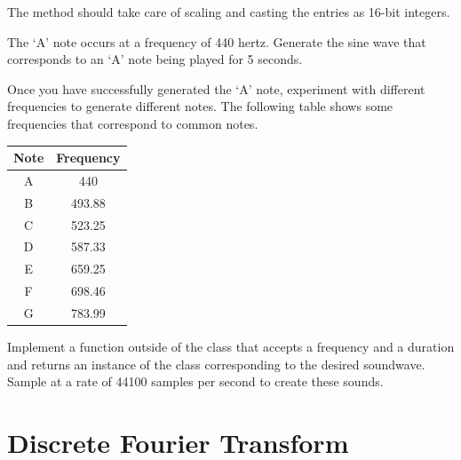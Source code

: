 The  method should take care of scaling and casting the entries as 16-bit integers.

\begin{problem}
The `A' note occurs at a frequency of 440 hertz.
Generate the sine wave that corresponds to an `A' note being played for 5 seconds.

Once you have successfully generated the `A' note, experiment with different frequencies to generate different notes.
The following table shows some frequencies that correspond to common notes.

\begin{center}
\begin{tabular}{|c|c|}
\hline
Note & Frequency \\
\hline
A & 440 \\
B & 493.88 \\
C & 523.25 \\
D & 587.33 \\
E & 659.25 \\
F & 698.46 \\
G & 783.99 \\
\hline
\end{tabular}
\end{center}

Implement a function outside of the  class that accepts a frequency and a duration and returns an instance of the  class corresponding to the desired soundwave.
Sample at a rate of 44100 samples per second to create these sounds.
\end{problem}

\section*{Discrete Fourier Transform}

